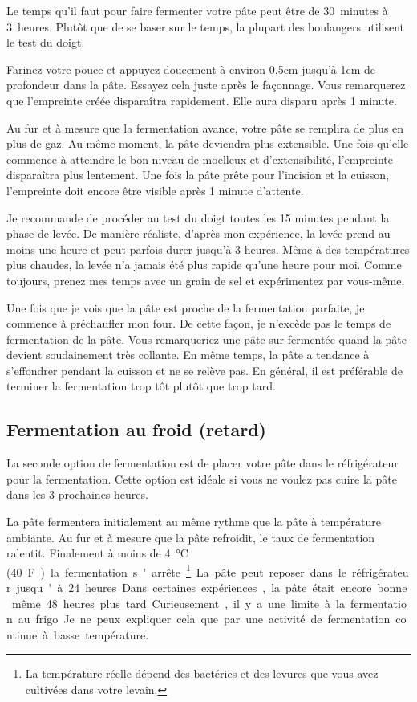 Le temps qu'il faut pour faire fermenter votre pâte peut être de 30~minutes à
3~heures. Plutôt que de se baser sur le temps, la plupart des boulangers utilisent le test du doigt.

Farinez votre pouce et appuyez doucement à environ 0,5cm jusqu'à 1cm de profondeur dans la pâte.
Essayez cela juste après le façonnage. Vous remarquerez que l'empreinte créée disparaîtra
rapidement. Elle aura disparu après 1 minute.

Au fur et à mesure que la fermentation avance, votre pâte se remplira de plus en plus de gaz. Au même
moment, la pâte deviendra plus extensible. Une fois qu'elle commence à atteindre le bon niveau de moelleux
et d'extensibilité, l'empreinte disparaîtra plus lentement.
Une fois la pâte prête pour l’incision et la cuisson, l'empreinte doit encore être visible après
1 minute d'attente.

Je recommande de procéder au test du doigt toutes les 15 minutes pendant
la phase de levée. De manière réaliste, d'après mon expérience, la levée prend au moins
une heure et peut parfois durer jusqu'à 3 heures. Même à des températures plus chaudes, la levée
n'a jamais été plus rapide qu'une heure pour moi. Comme toujours, prenez mes temps 
avec un grain de sel et expérimentez par vous-même.

Une fois que je vois que la pâte est proche de la fermentation parfaite, je commence à 
préchauffer mon four. De cette façon, je n'excède pas le temps de fermentation de la pâte. Vous remarqueriez une
pâte sur-fermentée quand la pâte devient soudainement très collante. En même
temps, la pâte a tendance à s'effondrer pendant la cuisson et ne se relève pas.
En général, il est préférable de terminer la fermentation trop tôt plutôt que trop tard.

\subsection{Fermentation au froid (retard)}

La seconde option de fermentation est de placer votre pâte dans le réfrigérateur pour
la fermentation. Cette option est idéale si vous ne voulez pas cuire la pâte
dans les 3 prochaines heures.

La pâte fermentera initialement au même rythme que la pâte à température ambiante.
Au fur et à mesure que la pâte refroidit, le taux de fermentation ralentit. Finalement à moins de
\qty{4}{\degreeCelsius} (\qty{40}F) la fermentation s'arrête\footnote{La température réelle
dépend des bactéries et des levures que vous avez cultivées dans votre levain.}. La pâte peut reposer dans le réfrigérateur jusqu'à 24 heures. Dans certaines
expériences, la pâte était encore bonne même 48 heures plus tard. Curieusement,
il y a une limite à la fermentation au frigo. Je ne peux expliquer cela que par une activité de fermentation continue à basse température.

